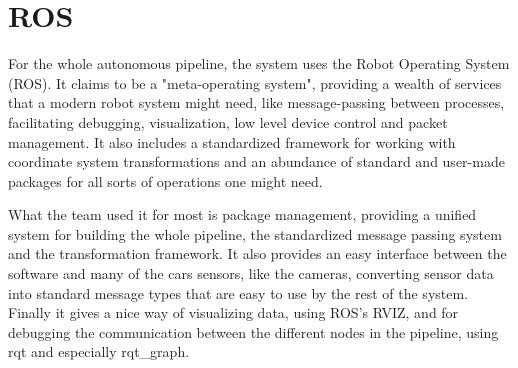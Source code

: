 \section{ROS}

For the whole autonomous pipeline, the system uses the Robot Operating System (ROS)\cite{ROS}. It claims to be a "meta-operating system", providing a wealth of services that a modern robot system might need, like message-passing between processes, facilitating debugging, visualization, low level device control and packet management. It also includes a standardized framework for working with coordinate system transformations and an abundance of standard and user-made packages for all sorts of operations one might need. 

What the team used it for most is package management, providing a unified system for building the whole pipeline, the standardized message passing system and the transformation framework. It also provides an easy interface between the software and many of the cars sensors, like the cameras, converting sensor data into standard message types that are easy to use by the rest of the system. Finally it gives a nice way of visualizing data, using ROS's RVIZ, and for debugging the communication between the different nodes in the pipeline, using rqt and especially rqt\_graph.